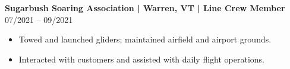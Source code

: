 \noindent
\textbf{Sugarbush Soaring Association | Warren, VT | Line Crew Member} \hfill 07/2021 -- 09/2021
\begin{itemize}
    \item Towed and launched gliders; maintained airfield and airport grounds.
    \item Interacted with customers and assisted with daily flight operations.
\end{itemize}
